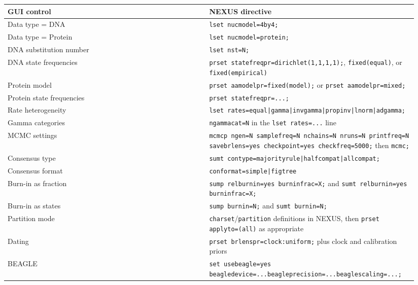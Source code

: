 \documentclass[11pt]{report}
\begin{document}
{\footnotesize
\begin{longtable}{@{}>{\raggedright\arraybackslash}p{0.47\linewidth}>{\raggedright\arraybackslash}p{0.47\linewidth}@{}}
\toprule
GUI control & NEXUS directive \\
\midrule
\endhead
Data type = DNA & \texttt{lset nucmodel=4by4;} \\
Data type = Protein & \texttt{lset nucmodel=protein;} \\
DNA substitution number & \texttt{lset nst=N;} \\
DNA state frequencies & \texttt{prset statefreqpr=dirichlet\allowbreak (1,1,1,1);}, \texttt{fixed\allowbreak (equal)}, or \texttt{fixed\allowbreak (empirical)} \\
Protein model & \texttt{prset aamodelpr=fixed\allowbreak (model);} or \texttt{prset aamodelpr=mixed;} \\
Protein state frequencies & \texttt{prset statefreqpr=.\allowbreak .\allowbreak .\allowbreak ;} \\
Rate heterogeneity & \texttt{lset rates=equal|\allowbreak gamma|\allowbreak invgamma|\allowbreak propinv|\allowbreak lnorm|\allowbreak adgamma;} \\
Gamma categories & \texttt{ngammacat=N} in the \texttt{lset rates=.\allowbreak .\allowbreak .\allowbreak } line \\
MCMC settings & \texttt{mcmcp ngen=N samplefreq=N nchains=N nruns=N printfreq=N savebrlens=yes checkpoint=yes checkfreq=5000;} then \texttt{mcmc;} \\
Consensus type & \texttt{sumt contype=majorityrule|\allowbreak halfcompat|\allowbreak allcompat;} \\
Consensus format & \texttt{conformat=simple|\allowbreak figtree} \\
Burn-in as fraction & \texttt{sump relburnin=yes burninfrac=X;} and \texttt{sumt relburnin=yes burninfrac=X;} \\
Burn-in as states & \texttt{sump burnin=N;} and \texttt{sumt burnin=N;} \\
Partition mode & \texttt{charset}/\texttt{partition} definitions in NEXUS, then \texttt{prset applyto=\allowbreak (all)} as appropriate \\
Dating & \texttt{prset brlenspr=clock:uniform;} plus clock and calibration priors \\
BEAGLE & \texttt{set usebeagle=yes beagledevice=.\allowbreak .\allowbreak .\allowbreak  beagleprecision=.\allowbreak .\allowbreak .\allowbreak  beaglescaling=.\allowbreak .\allowbreak .\allowbreak ;} \\
\bottomrule
\end{longtable}
}
\end{document}
